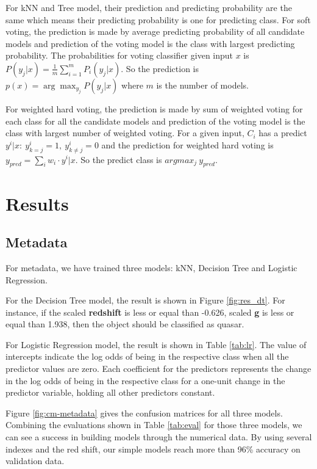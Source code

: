 \documentclass[
  11pt,
]{article}
\begin{document}
For kNN and Tree model, their prediction and predicting probability are the same which means their predicting probability is one for predicting class. For soft voting, the prediction is made by average predicting probability of all candidate models and prediction of the voting model is the class with largest predicting probability. The probabilities for voting classifier given input \(x\) is \(P(y_j | x) = \frac{1}{m} \sum_{i=1}^m P_i(y_j | x)\). So the prediction is \(p(x) = \arg \max_{y_j} P(y_j | x)\) where \(m\) is the number of models.

For weighted hard voting, the prediction is made by sum of weighted voting for each class for all the candidate models and prediction of the voting model is the class with largest number of weighted voting. For a given input, \(C_i\) has a predict \(y^{i}|x:~y^{i}_{k=j}=1, ~y^{i}_{k\neq j}=0\) and the prediction for weighted hard voting is \(y_{pred}=\sum_i w_i\cdot y^{i}|x\). So the predict class is \(argmax_j~y_{pred}\).

\hypertarget{results}{%
\section{Results}\label{results}}

\hypertarget{metadata}{%
\subsection{Metadata}\label{metadata}}

For metadata, we have trained three models: kNN, Decision Tree and Logistic Regression.

For the Decision Tree model, the result is shown in Figure \ref{fig:res_dt}. For instance, if the scaled \textbf{redshift} is less or equal than -0.626, scaled \textbf{g} is less or equal than 1.938, then the object should be classified as quasar.

For Logistic Regression model, the result is shown in Table \ref{tab:lr}. The value of intercepts indicate the log odds of being in the respective class when all the predictor values are zero. Each coefficient for the predictors represents the change in the log odds of being in the respective class for a one-unit change in the predictor variable, holding all other predictors constant.

Figure \ref{fig:cm-metadata} gives the confusion matrices for all three models. Combining the evaluations shown in Table \ref{tab:eval} for those three models, we can see a success in building models through the numerical data. By using several indexes and the red shift, our simple models reach more than 96\% accuracy on validation data.
\end{document}
